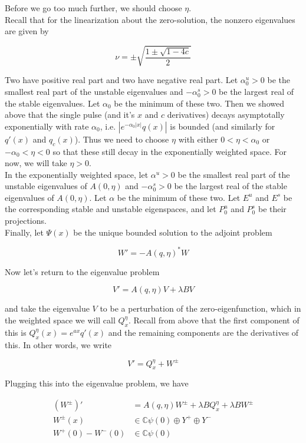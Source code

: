 \documentclass[12pt]{article}
\def\C{{\mathbb C}}
\begin{document}
Before we go too much further, we should choose $\eta$.\\

Recall that for the linearization about the zero-solution, the nonzero eigenvalues are given by

\[
\nu = \pm \sqrt{ \frac{1 \pm \sqrt{1 - 4c} }{2}}
\]

Two have positive real part and two have negative real part. Let $\alpha^u_0 > 0$ be the smallest real part of the unstable eigenvalues and $-\alpha^s_0 > 0$ be the largest real of the stable eigenvalues. Let $\alpha_0$ be the minimum of these two. Then we showed above that the single pulse (and it's $x$ and $c$ derivatives) decays asymptotally exponentially with rate $\alpha_0$, i.e. $|e^{-\alpha_0 |x|} q(x)|$ is bounded (and similarly for $q'(x)$ and $q_c(x)$). Thus we need to choose $\eta$ with either $0 < \eta < \alpha_0$ or $-\alpha_0 < \eta < 0$ so that these still decay in the exponentially weighted space. For now, we will take $\eta > 0$. \\

In the exponentially weighted space, let $\alpha^u > 0$ be the smallest real part of the unstable eigenvalues of $A(0, \eta)$ and $-\alpha^s_0 > 0$ be the largest real of the stable eigenvalues of $A(0, \eta)$. Let $\alpha$ be the minimum of these two. Let $E^u$ and $E^s$ be the corresponding stable and unstable eigenspaces, and let $P^u_0$ and $P^s_0$ be their projections.\\

Finally, let $\Psi(x)$ be the unique bounded solution to the adjoint problem

\[
W' = -A(q, \eta)^* W
\]

Now let's return to the eigenvalue problem

\[
V' = A(q, \eta)V + \lambda B V
\]

and take the eigenvalue $V$ to be a perturbation of the zero-eigenfunction, which in the weighted space we will call $Q^\eta_x$. Recall from above that the first component of this is $Q^\eta_x(x) = e^{ax} q'(x)$ and the remaining components are the derivatives of this. In other words, we write

\[
V' = Q^\eta_x + W^\pm
\]

Plugging this into the eigenvalue problem, we have

\begin{align*}
(W^\pm)' &= A(q, \eta)W^\pm + \lambda B Q^\eta_x + \lambda B W^\pm \\
W^\pm(x) &\in \C \psi(0) \oplus Y^+ \oplus Y^- \\
W^+(0) - W^-(0) &\in \C \psi(0) 
\end{align*}
\end{document}
